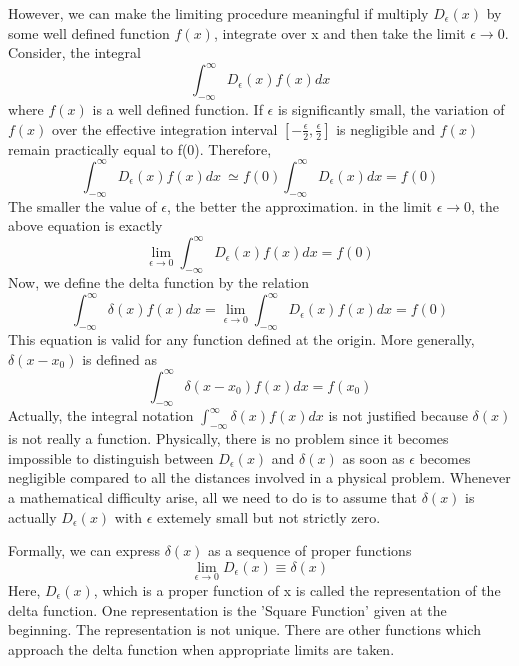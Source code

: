 However, we can make the limiting procedure meaningful if multiply $D_\epsilon (x)$ by some well defined function $f(x)$, integrate over x and then take the limit $\epsilon \to 0$. Consider, the integral $$\int_{-\infty}^\infty D_\epsilon (x) f(x) dx $$ where $f(x)$ is a well defined function. If $\epsilon$ is significantly small, the variation of $f(x)$ over the effective integration interval $[-\frac{\epsilon}{2},\frac{\epsilon}{2}]$ is negligible and $f(x)$ remain practically equal to f(0). Therefore,
\begin{equation}
\int_{-\infty}^{\infty} D_\epsilon (x) f(x) dx \ \simeq f(0) \int_{-\infty}^{\infty} D_\epsilon (x) dx = f(0)
\end{equation}
The smaller the value of $\epsilon$, the better the approximation. in the limit $\epsilon \to 0$, the above equation is exactly
\begin{equation}
\lim_{\epsilon \to 0} \int_{-\infty}^{\infty} D_\epsilon (x) f(x) dx = f(0)
\end{equation} 
Now, we define the delta function by the relation
\begin{equation}
\int_{-\infty}^\infty \delta (x) f(x) dx = \lim_{\epsilon \to 0} \int_{-\infty}^{\infty} D_\epsilon (x) f(x) dx = f(0)
\end{equation}
This equation is valid for any function defined at the origin. More generally, $\delta (x-x_0)$ is defined as
\begin{equation}
\int_{-\infty}^\infty \delta (x-x_0) f(x) dx = f(x_0)
\end{equation}
Actually, the integral notation $\int_{-\infty}^\infty \delta (x) f(x) dx $ is not justified because $\delta(x)$ is not really a function. Physically, there is no problem since it becomes impossible to distinguish between $D_\epsilon (x)$ and $\delta (x)$ as soon as $\epsilon$ becomes negligible compared to all the distances involved in a physical problem. Whenever a mathematical difficulty arise, all we need to do is to assume that $\delta (x)$ is actually $D_\epsilon (x)$ with $\epsilon$ extemely small but not strictly zero.


Formally, we can express $\delta(x)$ as a sequence of proper functions $$\lim_{\epsilon \to 0} D_\epsilon (x) \equiv \delta(x) $$ Here, $D_\epsilon (x)$, which is a proper function of x is called the representation of the delta function. One representation is the 'Square Function' given at the beginning. The representation is not unique. There are other functions which approach the delta function when appropriate limits are taken.

